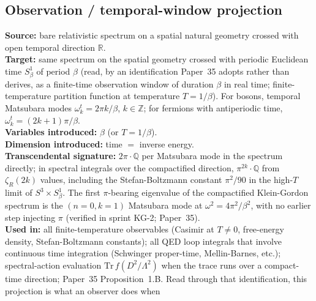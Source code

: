 \documentclass[11pt]{article}
\begin{document}
\subsection{Observation / temporal-window projection}
\label{sec:proj_observation}
\textbf{Source:} bare relativistic spectrum on a spatial natural
geometry crossed with open temporal direction $\mathbb{R}$.\\
\textbf{Target:} same spectrum on the spatial geometry crossed with
periodic Euclidean time $S^1_\beta$ of period $\beta$ (read, by an
identification Paper~35 adopts rather than derives, as a finite-time
observation window of duration $\beta$ in real time;
finite-temperature partition function at temperature $T = 1/\beta$).
For bosons, temporal Matsubara modes $\omega^t_k = 2\pi k / \beta$,
$k \in \mathbb{Z}$; for fermions with antiperiodic time,
$\omega^t_k = (2k+1)\pi / \beta$.\\
\textbf{Variables introduced:} $\beta$ (or $T = 1/\beta$).\\
\textbf{Dimension introduced:} time $=$ inverse energy.\\
\textbf{Transcendental signature:} $2\pi \cdot \mathbb{Q}$ per
Matsubara mode in the spectrum directly; in spectral integrals over
the compactified direction, $\pi^{2k} \cdot \mathbb{Q}$ from
$\zeta_R(2k)$ values, including the Stefan-Boltzmann
constant $\pi^2/90$ in the high-$T$ limit of $S^3 \times S^1_\beta$.
The first $\pi$-bearing eigenvalue of the compactified Klein-Gordon
spectrum is the $(n{=}0, k{=}1)$ Matsubara mode at
$\omega^2 = 4\pi^2/\beta^2$, with no earlier step injecting $\pi$
(verified in sprint KG-2; Paper~35).\\
\textbf{Used in:} all finite-temperature observables (Casimir at
$T \neq 0$, free-energy density, Stefan-Boltzmann constants); all
QED loop integrals that involve continuous time integration (Schwinger
proper-time, Mellin-Barnes, etc.); spectral-action evaluation
$\mathrm{Tr}\, f(D^2/\Lambda^2)$ when the trace runs over a
compact-time direction; Paper~35 Proposition~1.B.  Read through that
identification, this projection is what an observer does when
\end{document}
